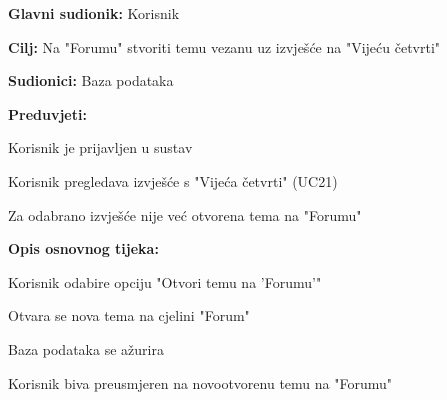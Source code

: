 						
						
					\noindent {}
					\begin{packed_item}
	
						\item \textbf{Glavni sudionik: }Korisnik
						\item  \textbf{Cilj:} Na "Forumu" stvoriti temu vezanu uz izvješće na "Vijeću četvrti"
						\item  \textbf{Sudionici:} Baza podataka
						\item  \textbf{Preduvjeti:}
						\item[] \begin{packed_enum}
							\item Korisnik je prijavljen u sustav
							\item Korisnik pregledava izvješće s "Vijeća četvrti" (UC21)
							\item Za odabrano izvješće nije već otvorena tema na "Forumu"								\end{packed_enum}
						\item  \textbf{Opis osnovnog tijeka:}
						
						\item[] \begin{packed_enum}
	
							\item Korisnik odabire opciju "Otvori temu na 'Forumu'"
							\item Otvara se nova tema na cjelini "Forum"
							\item Baza podataka se ažurira
							\item Korisnik biva preusmjeren na novootvorenu temu na "Forumu"
							
						\end{packed_enum}				
						
					\end{packed_item}
					
